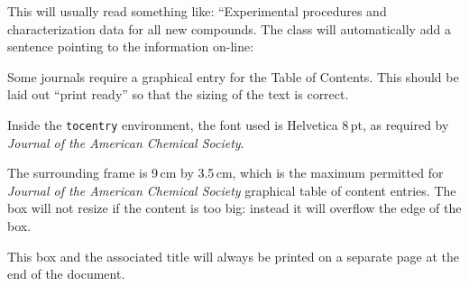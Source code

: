 \documentclass[english,journal=jctcce,etalmode=truncate,maxauthors=0]{achemso}
\begin{document}
\begin{suppinfo}
	This will usually read something like: ``Experimental procedures and characterization data for all new compounds. The class will automatically add a sentence pointing to the information on-line:
\end{suppinfo}

\newpage %

\begin{tocentry}

Some journals require a graphical entry for the Table of Contents.
This should be laid out ``print ready'' so that the sizing of the
text is correct.

Inside the \texttt{tocentry} environment, the font used is Helvetica
8\,pt, as required by \emph{Journal of the American Chemical
Society}.

The surrounding frame is 9\,cm by 3.5\,cm, which is the maximum
permitted for  \emph{Journal of the American Chemical Society}
graphical table of content entries. The box will not resize if the
content is too big: instead it will overflow the edge of the box.

This box and the associated title will always be printed on a
separate page at the end of the document.

\end{tocentry}

%
%


%
%
%
\newpage
\end{document}
